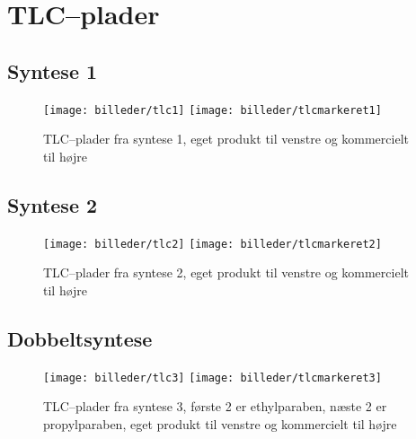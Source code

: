     \begin{table}[H]\centering
        \caption{} \vskip -24pt
    \end{table}
    
    \section{TLC--plader}
    \subsection{Syntese 1}
    \begin{figure}[H]
        \texttt{[image: billeder/tlc1]}
        \texttt{[image: billeder/tlcmarkeret1]}
        \caption{TLC--plader fra syntese 1, eget produkt til venstre og kommercielt til højre}
    \end{figure} \vskip -24pt

    \subsection{Syntese 2}
    \begin{figure}[H]
        \texttt{[image: billeder/tlc2]}
        \texttt{[image: billeder/tlcmarkeret2]}
        \caption{TLC--plader fra syntese 2, eget produkt til venstre og kommercielt til højre}
    \end{figure} \vskip -24pt

    \subsection{Dobbeltsyntese}
    \begin{figure}[H]
        \texttt{[image: billeder/tlc3]}
        \texttt{[image: billeder/tlcmarkeret3]}
        \caption{TLC--plader fra syntese 3, første 2 er ethylparaben, næste 2 er propylparaben, eget produkt til venstre og kommercielt til højre}
    \end{figure} \vskip -24pt

